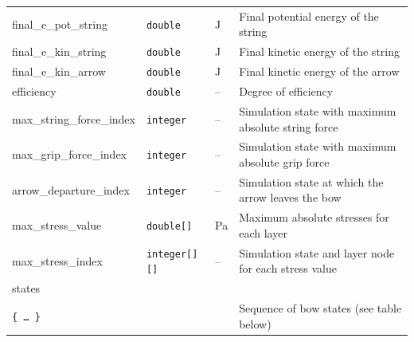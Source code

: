 \documentclass[12pt]{article}
\begin{document}
\begin{table}[H]
{\begin{tabular}{ l | l | l | l }
\quad final\_e\_pot\_string & \texttt{double} & \unit[]{J} & Final potential energy of the string \\
\quad final\_e\_kin\_string & \texttt{double} & \unit[]{J} & Final kinetic energy of the string \\
\quad final\_e\_kin\_arrow & \texttt{double} & \unit[]{J} & Final kinetic energy of the arrow \\
\quad efficiency & \texttt{double} & -- & Degree of efficiency \\
\quad max\_string\_force\_index & \texttt{integer} & -- & Simulation state with maximum absolute string force \\
\quad max\_grip\_force\_index & \texttt{integer} & -- & Simulation state with maximum absolute grip force \\
\quad arrow\_departure\_index & \texttt{integer} & -- & Simulation state at which the arrow leaves the bow \\
\quad max\_stress\_value & \texttt{double[]} & \unit[]{Pa} & Maximum absolute stresses for each layer \\
\quad max\_stress\_index & \texttt{integer[][]} & -- & Simulation state and layer node for each stress value \\
\quad states & & & \\
\quad\quad \texttt{\{\ \ldots\ \}} & & & Sequence of bow states (see table below) \\
\end{tabular}}
\end{table}
\end{document}
